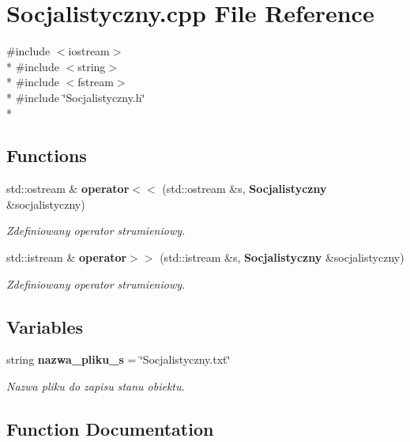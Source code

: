 \section{Socjalistyczny.\+cpp File Reference}
\label{_socjalistyczny_8cpp}
{\ttfamily \#include $<$iostream$>$}\\*
{\ttfamily \#include $<$string$>$}\\*
{\ttfamily \#include $<$fstream$>$}\\*
{\ttfamily \#include \char`\"{}Socjalistyczny.\+h\char`\"{}}\\*
\subsection*{Functions}
\begin{DoxyCompactItemize}
\item 
std\+::ostream \& {\bf operator$<$$<$} (std\+::ostream \&s, {\bf Socjalistyczny} \&socjalistyczny)
\begin{DoxyCompactList}\small\item\em Zdefiniowany operator strumieniowy. \end{DoxyCompactList}\item 
std\+::istream \& {\bf operator$>$$>$} (std\+::istream \&s, {\bf Socjalistyczny} \&socjalistyczny)
\begin{DoxyCompactList}\small\item\em Zdefiniowany operator strumieniowy. \end{DoxyCompactList}\end{DoxyCompactItemize}
\subsection*{Variables}
\begin{DoxyCompactItemize}
\item 
string {\bf nazwa\+\_\+pliku\+\_\+s} = \char`\"{}Socjalistyczny.\+txt\char`\"{}
\begin{DoxyCompactList}\small\item\em Nazwa pliku do zapisu stanu obiektu. \end{DoxyCompactList}\end{DoxyCompactItemize}


\subsection{Function Documentation}

